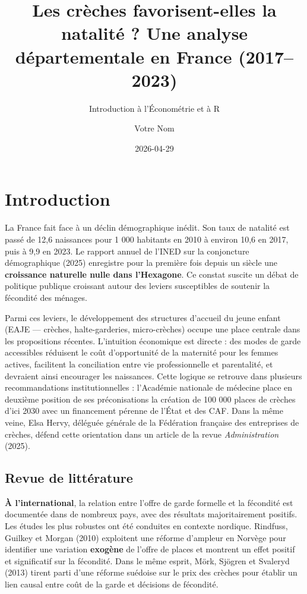 \documentclass[
  letterpaper,
  DIV=11,
  numbers=noendperiod]{scrartcl}
\title{Les crèches favorisent-elles la natalité ? Une analyse
départementale en France (2017--2023)}
\subtitle{Introduction à l'Économétrie et à R}
\author{Votre Nom}
\date{2026-04-29}
\renewcommand*\contentsname{Table of contents}
\newcommand\contentsname{Table of contents}
\begin{document}
\maketitle

\renewcommand*\contentsname{Table of contents}
{
\setcounter{tocdepth}{3}
\tableofcontents
}

\section{Introduction}\label{introduction}

La France fait face à un déclin démographique inédit. Son taux de
natalité est passé de 12,6 naissances pour 1 000 habitants en 2010 à
environ 10,6 en 2017, puis à 9,9 en 2023. Le rapport annuel de l'INED
sur la conjoncture démographique (2025) enregistre pour la première fois
depuis un siècle une \textbf{croissance naturelle nulle dans
l'Hexagone}. Ce constat suscite un débat de politique publique croissant
autour des leviers susceptibles de soutenir la fécondité des ménages.

Parmi ces leviers, le développement des structures d'accueil du jeune
enfant (EAJE --- crèches, halte-garderies, micro-crèches) occupe une
place centrale dans les propositions récentes. L'intuition économique
est directe : des modes de garde accessibles réduisent le coût
d'opportunité de la maternité pour les femmes actives, facilitent la
conciliation entre vie professionnelle et parentalité, et devraient
ainsi encourager les naissances. Cette logique se retrouve dans
plusieurs recommandations institutionnelles : l'Académie nationale de
médecine place en deuxième position de ses préconisations la création de
100 000 places de crèches d'ici 2030 avec un financement pérenne de
l'État et des CAF. Dans la même veine, Elsa Hervy, déléguée générale de
la Fédération française des entreprises de crèches, défend cette
orientation dans un article de la revue \emph{Administration} (2025).

\subsection{Revue de littérature}\label{revue-de-littuxe9rature}

\textbf{À l'international}, la relation entre l'offre de garde formelle
et la fécondité est documentée dans de nombreux pays, avec des résultats
majoritairement positifs. Les études les plus robustes ont été conduites
en contexte nordique. Rindfuss, Guilkey et Morgan (2010) exploitent une
réforme d'ampleur en Norvège pour identifier une variation
\textbf{exogène} de l'offre de places et montrent un effet positif et
significatif sur la fécondité. Dans le même esprit, Mörk, Sjögren et
Svaleryd (2013) tirent parti d'une réforme suédoise sur le prix des
crèches pour établir un lien causal entre coût de la garde et décisions
de fécondité.
\end{document}
